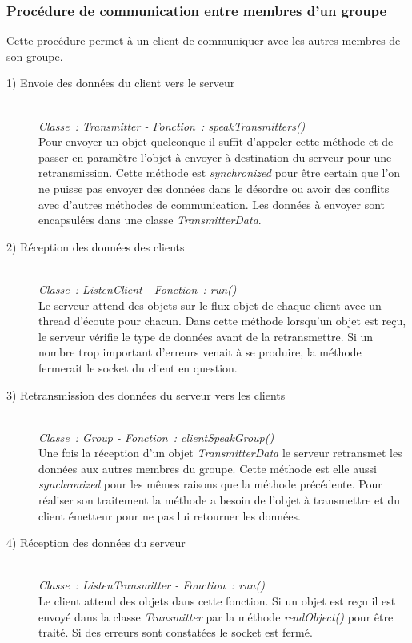 \documentclass[a4paper,11pt]{report}
\begin{document}
\subsubsection{Procédure de communication entre membres d’un groupe}
Cette procédure permet à un client de communiquer avec les autres membres de son groupe.
\begin{description}
  \item[1) Envoie des données du client vers le serveur]
    \textit{\\Classe : Transmitter - Fonction : speakTransmitters()\\}
	  Pour envoyer un objet quelconque il suffit d’appeler cette méthode et de passer en paramètre l’objet à envoyer à destination du serveur pour une retransmission. Cette méthode est \textit{synchronized} pour être certain que l’on ne puisse pas envoyer des données dans le désordre ou avoir des conflits avec d’autres méthodes de communication. Les données à envoyer sont encapsulées dans une classe \textit{TransmitterData}.
	
	\item[2) Réception des données des clients]
	\textit{\\Classe : ListenClient - Fonction : run()\\}
	  Le serveur attend des objets sur le flux objet de chaque client avec un thread d'écoute pour chacun.
Dans cette méthode lorsqu’un objet est reçu, le serveur vérifie le type de données avant de la retransmettre. Si un nombre trop important d’erreurs venait à se produire, la méthode fermerait le socket du client en question.

  \item[3) Retransmission des données du serveur vers les clients]
  \textit{\\Classe : Group - Fonction : clientSpeakGroup()\\}
    Une fois la réception d’un objet  \textit{TransmitterData} le serveur retransmet les données aux autres membres du groupe. Cette méthode est elle aussi  \textit{synchronized} pour les mêmes raisons que la méthode précédente. Pour réaliser son traitement la méthode a besoin de l’objet à transmettre et du client émetteur pour ne pas lui retourner les données.
    
  \item[4) Réception des données du serveur]
  \textit{\\Classe : ListenTransmitter - Fonction : run()\\}
    Le client attend des objets dans cette fonction. Si un objet est reçu il est envoyé dans la classe \textit{Transmitter} par la méthode \textit{readObject()} pour être traité. Si des erreurs sont constatées le socket est fermé.
\end{description}
\end{document}
